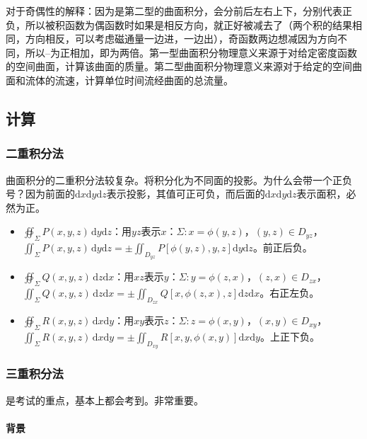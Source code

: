 对于奇偶性的解释：因为是第二型的曲面积分，会分前后左右上下，分别代表正负，所以被积函数为偶函数时如果是相反方向，就正好被减去了（两个积的结果相同，方向相反，可以考虑磁通量一边进，一边出），奇函数两边想减因为方向不同，所以--为正相加，即为两倍。第一型曲面积分物理意义来源于对给定密度函数的空间曲面，计算该曲面的质量。第二型曲面积分物理意义来源对于给定的空间曲面和流体的流速，计算单位时间流经曲面的总流量。

\subsection{计算}

\subsubsection{二重积分法}

曲面积分的二重积分法较复杂。将积分化为不同面的投影。为什么会带一个正负号？因为前面的$\textrm{d}x\textrm{d}y\textrm{d}z$表示投影，其值可正可负，而后面的$\textrm{d}x\textrm{d}y\textrm{d}z$表示面积，必然为正。

\begin{itemize}
    \item $\oiint_\Sigma P(x,y,z)\,\textrm{d}y\textrm{d}z$：用$yz$表示$x$：$\Sigma:x=\phi(y,z)$，$(y,z)\in D_{yz}$，\\$\iint_\Sigma P(x,y,z)\,\textrm{d}y\textrm{d}z=\pm\iint_{D_{yz}}P[\phi(y,z),y,z]\textrm{d}y\textrm{d}z$。前正后负。
    \item $\oiint_\Sigma Q(x,y,z)\,\textrm{d}z\textrm{d}x$：用$xz$表示$y$：$\Sigma:y=\phi(z,x)$，$(z,x)\in D_{zx}$，\\$\iint_\Sigma Q(x,y,z)\,\textrm{d}z\textrm{d}x=\pm\iint_{D_{zx}}Q[x,\phi(z,x),z]\textrm{d}z\textrm{d}x$。右正左负。
    \item $\oiint_\Sigma R(x,y,z)\,\textrm{d}x\textrm{d}y$：用$xy$表示$z$：$\Sigma:z=\phi(x,y)$，$(x,y)\in D_{xy}$，\\$\iint_\Sigma R(x,y,z)\,\textrm{d}x\textrm{d}y=\pm\iint_{D_{xy}}R[x,y,\phi(x,y)]\textrm{d}x\textrm{d}y$。上正下负。
\end{itemize}

\subsubsection{三重积分法}

是考试的重点，基本上都会考到。非常重要。

\paragraph{背景} \leavevmode \medskip

